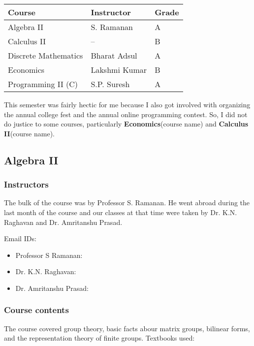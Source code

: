 \documentclass[a4paper]{amsart}
\newcommand{\coursename}[1]{{\bf #1}{\small{(course name)}}}
\begin{document}
\begin{tabular}{|l|l|l|}
  \hline
  Course & Instructor & Grade \\
  \hline

  Algebra II & S. Ramanan & A \\
  Calculus II & -- & B \\
  Discrete Mathematics & Bharat Adsul & A\\
  Economics & Lakshmi Kumar & B\\
  Programming II (C) & S.P. Suresh & A \\
  \hline
\end{tabular}

This semester was fairly hectic for me because I also got involved with organizing the annual college fest
and the annual online programming contest. So, I did not do justice to some courses, particularly \coursename{Economics} and \coursename{Calculus II}.

\subsection{Algebra II}\label{algebra2}

\subsubsection{Instructors}

The bulk of the course was by Professor S. Ramanan. He went abroad during the last month of the course
and our classes at that time were taken by Dr. K.N. Raghavan and Dr. Amritanshu Prasad.

Email IDs:

\begin{itemize}

\item Professor S Ramanan: 

\item Dr. K.N. Raghavan: 

\item Dr. Amritanshu Prasad: 

\end{itemize}

\subsubsection{Course contents}

The course covered group theory, basic facts abour matrix groups, bilinear forms, and the representation
theory of finite groups. Textbooks used:
\end{document}
